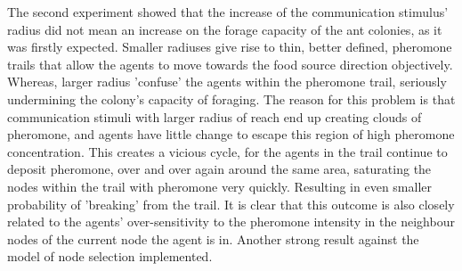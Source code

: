 The second experiment showed that the increase of the communication stimulus' radius did not mean an increase on the forage capacity of the ant colonies, as it was firstly expected. Smaller radiuses give rise to thin, better defined, pheromone trails that allow the agents to move towards the food source direction objectively. Whereas, larger radius 'confuse' the agents within the pheromone trail, seriously undermining the colony's capacity of foraging. The reason for this problem is that communication stimuli with larger radius of reach end up creating clouds of pheromone, and agents have little change to escape this region of high pheromone concentration. This creates a vicious cycle, for the agents in the trail continue to deposit pheromone, over and over again around the same area, saturating the nodes within the trail with pheromone very quickly. Resulting in even smaller probability of 'breaking' from the trail. It is clear that this outcome is also closely related to the agents' over-sensitivity to the pheromone intensity in the neighbour nodes of the current node the agent is in. Another strong result against the model of node selection implemented.